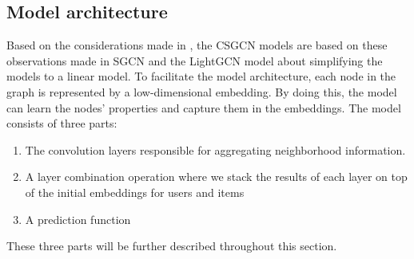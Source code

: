 \subsection{Model architecture}\label{subsec:csgcn_is_model_architecture}
Based on the considerations made in , the CSGCN models are based on these observations made in SGCN \cite{SimplifyingGCN} and the LightGCN model \cite{LightGCN} about simplifying the models to a linear model.
To facilitate the model architecture, each node in the graph is represented by a low-dimensional embedding.
By doing this, the model can learn the nodes' properties and capture them in the embeddings.
The model consists of three parts:
\begin{enumerate}
    \item The convolution layers responsible for aggregating neighborhood information.
    \item A layer combination operation where we stack the results of each layer on top of the initial embeddings for users and items
    \item A prediction function
\end{enumerate}
These three parts will be further described throughout this section.


